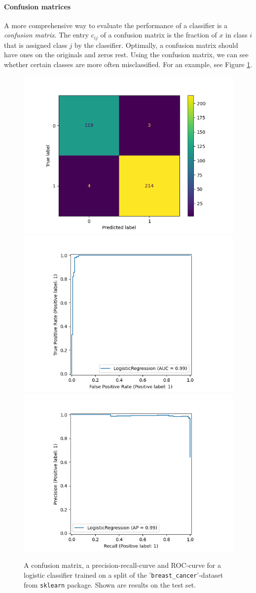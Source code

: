 \documentclass{article}
\begin{document}
\paragraph{Confusion matrices } A more comprehensive way to evaluate the performance of a classifier is a \emph{confusion matrix}. The entry $c_{ij}$ of a confusion matrix is the fraction of $x$ in class $i$ that is assigned class $j$ by the classifier. Optimally, a confusion matrix should have ones on the originals and zeros rest. Using the confusion matrix, we can see whether certain classes are more often misclassified. For an example, see Figure \ref{fig:error_metrix}.

\begin{figure}
    \centering
    \includegraphics[width=0.31\linewidth]{graphics/confusion_matrix.png}
    \includegraphics[width=0.31\linewidth]{graphics/pr.png}
    \includegraphics[width=0.31\linewidth]{graphics/roc.png}
    \caption{A confusion matrix, a precision-recall-curve and ROC-curve for a logistic classifier trained on a split of the '\texttt{breast\_cancer}'-dataset from \texttt{sklearn} package. Shown are results on the test set.}
    \label{fig:error_metrix}
\end{figure}
\end{document}
